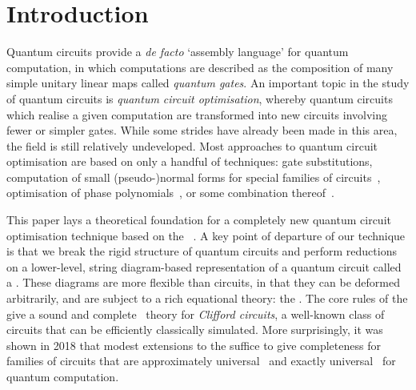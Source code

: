 \documentclass[a4paper,onecolumn,superscriptaddress,11pt,accepted=2020-04-27]{quantumarticle}
\theoremstyle{definition}
\begin{document}
\section{Introduction}

Quantum circuits provide a \textit{de facto} `assembly language' for quantum computation, in which computations are described as the composition of many simple unitary linear maps called \textit{quantum gates}. An important topic in the study of quantum circuits is \textit{quantum circuit optimisation}, whereby quantum circuits which realise a given computation are transformed into new circuits involving fewer or simpler gates.
While some strides have already been made in this area, the field is still relatively undeveloped. Most approaches to quantum circuit optimisation are based on only a handful of techniques: gate substitutions, computation of small (pseudo-)normal forms for special families of circuits~\cite{aaronsongottesman2004,markov2008optimal,CliffOpt}, optimisation of phase polynomials~\cite{amy2014polynomial,heyfron2018efficient}, or some combination thereof~\cite{abdessaied2014quantum,nam2018automated}.

This paper lays a theoretical foundation for a completely new quantum circuit optimisation technique based on the \zxcalculus~\cite{CD2}. A key point of departure of our technique is that we break the rigid structure of quantum circuits and perform reductions on a lower-level, string diagram-based representation of a quantum circuit called a \textit{\zxdiagram}. These diagrams are more flexible than circuits, in that they can be deformed arbitrarily, and are subject to a rich equational theory: the \zxcalculus.
The core rules of the \zxcalculus give a sound and complete~\cite{Backens1} theory for \textit{Clifford circuits}, a well-known class of circuits that can be efficiently classically simulated. More surprisingly, it was shown in 2018 that modest extensions to the \zxcalculus suffice to give completeness for families of circuits that are approximately universal~\cite{SimonCompleteness,ZXNormalForm} and exactly universal~\cite{HarnyAmarCompleteness,JPV-universal,euler-zx,carette2019completeness} for quantum computation.


\end{document}

